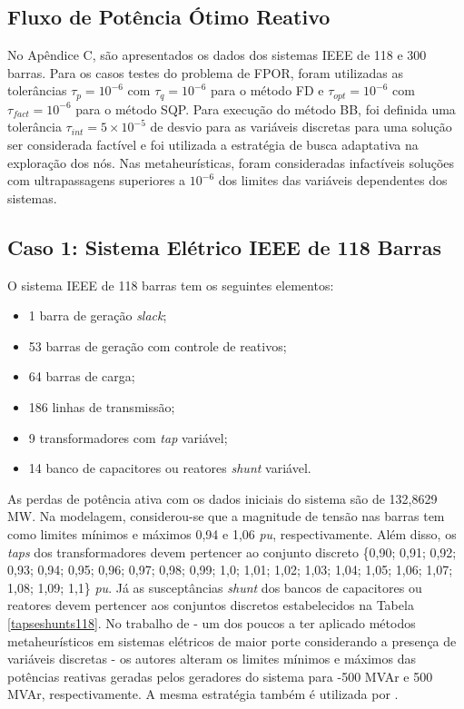 \documentclass[
	12pt,				%
	openany,			%
	twoside,			%
	a4paper,			%
	chapter=TITLE,		%
	section=Title,		%
	subsection=Title,	%
	subsubsection=Title,%
	english,			%
	french,				%
	spanish,			%
	brazil			%
	]{abntex2}
\begin{document}
\begin{ERRATA}
\section{Fluxo de Potência Ótimo Reativo}

No Apêndice C, são apresentados os dados dos sistemas IEEE de 118 e 300 barras. Para os casos testes do problema de FPOR, foram utilizadas as tolerâncias $\tau_p = 10^{-6}$ com $\tau_q = 10^{-6}$ para o método FD e $\tau_{opt} = 10^{-6}$ com $\tau_{fact} = 10^{-6}$ para o método SQP. Para execução do método BB, foi definida uma tolerância $\tau_{int} = 5\times10^{-5}$ de desvio para as variáveis discretas para uma solução ser considerada factível e foi utilizada a estratégia de busca adaptativa na exploração dos nós. Nas metaheurísticas, foram consideradas infactíveis soluções com ultrapassagens superiores a $10^{-6}$ dos limites das variáveis dependentes dos sistemas.

\subsection{Caso 1: Sistema Elétrico IEEE de 118 Barras}

O sistema IEEE de 118 barras tem os seguintes elementos:

\begin{itemize}
    \item 1 barra de geração \emph{slack};
    \item 53 barras de geração com controle de reativos;
    \item 64 barras de carga;
    \item 186 linhas de transmissão;
    \item 9 transformadores com \emph{tap} variável;
    \item 14 banco de capacitores ou reatores \emph{shunt} variável.
\end{itemize}


As perdas de potência ativa com os dados iniciais do sistema são de 132,8629 MW. Na modelagem, considerou-se que a magnitude de tensão nas barras tem como limites mínimos e máximos 0,94 e 1,06 \emph{pu}, respectivamente. Além disso, os \emph{taps} dos transformadores devem pertencer ao conjunto discreto \{0,90; 0,91; 0,92; 0,93; 0,94; 0,95; 0,96; 0,97; 0,98; 0,99; 1,0; 1,01; 1,02; 1,03; 1,04; 1,05; 1,06; 1,07; 1,08; 1,09; 1,1\} \emph{pu}. Já as susceptâncias \emph{shunt} dos bancos de capacitores ou reatores devem pertencer aos conjuntos discretos estabelecidos na Tabela \ref{tapseshunts118}. No trabalho de  - um dos poucos a ter aplicado métodos metaheurísticos em sistemas elétricos de maior porte considerando a presença de variáveis discretas - os autores alteram os limites mínimos e máximos das potências reativas geradas pelos geradores do sistema para -500 MVAr e 500 MVAr, respectivamente. A mesma estratégia também é utilizada por . 


\end{ERRATA}
\end{document}
